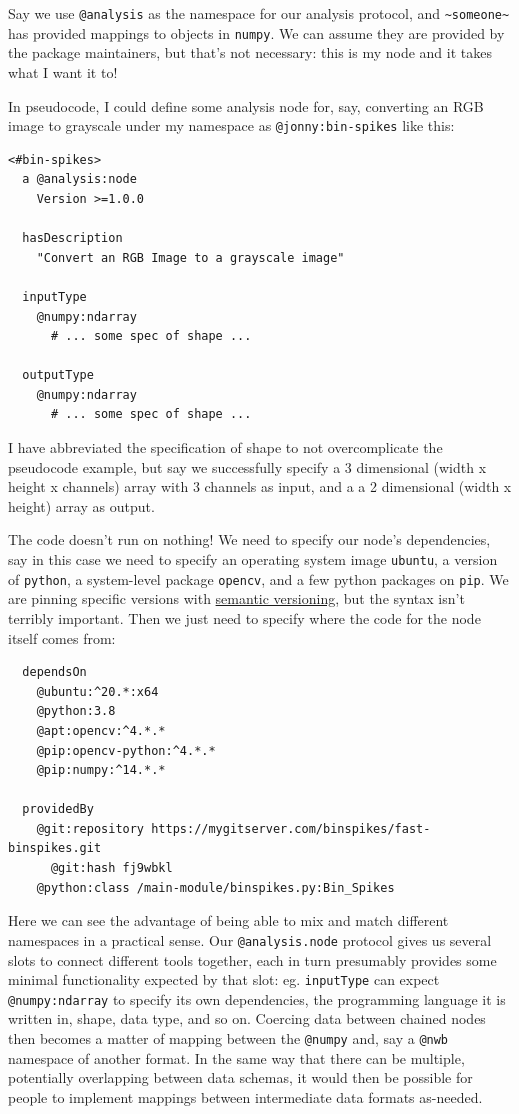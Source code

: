 \documentclass[10pt]{tufte-book}
\begin{document}
Say we use \texttt{@analysis} as the namespace for our analysis
protocol, and \texttt{\textasciitilde{}someone\textasciitilde{}} has
provided mappings to objects in \texttt{numpy}. We can assume they are
provided by the package maintainers, but that's not necessary: this is
my node and it takes what I want it to!

In pseudocode, I could define some analysis node for, say, converting an
RGB image to grayscale under my namespace as \texttt{@jonny:bin-spikes}
like this:

\begin{verbatim}
<#bin-spikes>
  a @analysis:node
    Version >=1.0.0

  hasDescription
    "Convert an RGB Image to a grayscale image"

  inputType
    @numpy:ndarray
      # ... some spec of shape ...

  outputType
    @numpy:ndarray
      # ... some spec of shape ...
\end{verbatim}

I have abbreviated the specification of shape to not overcomplicate the
pseudocode example, but say we successfully specify a 3 dimensional
(width x height x channels) array with 3 channels as input, and a a 2
dimensional (width x height) array as output.

The code doesn't run on nothing! We need to specify our node's
dependencies, say in this case we need to specify an operating system
image \texttt{ubuntu}, a version of \texttt{python}, a system-level
package \texttt{opencv}, and a few python packages on \texttt{pip}. We
are pinning specific versions with \href{https://semver.org/}{semantic
versioning}, but the syntax isn't terribly important. Then we just need
to specify where the code for the node itself comes from:

\begin{verbatim}
  dependsOn
    @ubuntu:^20.*:x64
    @python:3.8
    @apt:opencv:^4.*.*
    @pip:opencv-python:^4.*.*
    @pip:numpy:^14.*.*

  providedBy
    @git:repository https://mygitserver.com/binspikes/fast-binspikes.git
      @git:hash fj9wbkl
    @python:class /main-module/binspikes.py:Bin_Spikes
\end{verbatim}

Here we can see the advantage of being able to mix and match different
namespaces in a practical sense. Our \texttt{@analysis.node} protocol
gives us several slots to connect different tools together, each in turn
presumably provides some minimal functionality expected by that slot:
eg. \texttt{inputType} can expect \texttt{@numpy:ndarray} to specify its
own dependencies, the programming language it is written in, shape, data
type, and so on. Coercing data between chained nodes then becomes a
matter of mapping between the \texttt{@numpy} and, say a \texttt{@nwb}
namespace of another format. In the same way that there can be multiple,
potentially overlapping between data schemas, it would then be possible
for people to implement mappings between intermediate data formats
as-needed.
\end{document}

